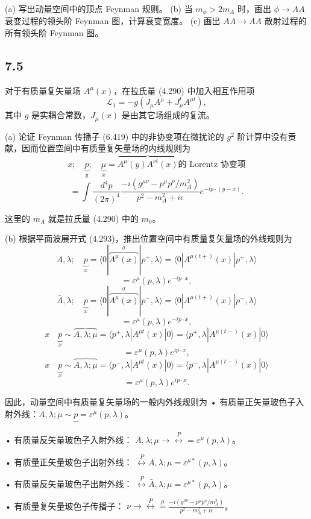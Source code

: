 (a) 写出动量空间中的顶点 Feynman 规则。
(b) 当 $m_\phi > 2m_A$ 时，画出 $\phi \rightarrow AA$ 衰变过程的领头阶 Feynman 图，计算衰变宽度。
(c) 画出 $AA \rightarrow AA$ 散射过程的所有领头阶 Feynman 图。

\newpage
\subsection{7.5}
对于有质量复矢量场 $A^\mu(x)$，在拉氏量 (4.290) 中加入相互作用项
$$ \mathcal{L}_1 = -g(J_\mu A^\mu + J_\mu^t A^{\mu t}), \tag{7.161} $$
其中 $g$ 是实耦合常数，$J_\mu(x)$ 是由其它场组成的复流。

(a) 论证 Feynman 传播子 (6.419) 中的非协变项在微扰论的 $g^2$ 阶计算中没有贡献，因而位置空间中有质量复矢量场的内线规则为
$$ x; \quad \underbrace{p}_{y}; \quad \underbrace{\mu}_{x} = \overbrace{A^\mu(y)A^{\nu t}(x)}_{} \text{的 Lorentz 协变项} $$
$$ = \int \frac{d^4p}{(2\pi)^4} \frac{-i(g^{\mu\nu} - p^\mu p^\nu / m_A^2)}{p^2 - m_A^2 + i\epsilon} e^{-ip\cdot(y-x)}. \tag{7.162} $$

这里的 $m_A$ 就是拉氏量 (4.290) 中的 $m_0$。

(b) 根据平面波展开式 (4.293)，推出位置空间中有质量复矢量场的外线规则为
$$ A, \lambda; \quad \underbrace{p}_{x} = \langle 0 | \overbrace{A^\mu(x)}^{\sigma} | p^+, \lambda \rangle = \langle 0 | A^{\mu(t+)} (x) | p^+, \lambda \rangle $$
$$ = \varepsilon^\mu(p, \lambda)e^{-ip\cdot x}, \tag{7.163} $$
$$ \bar{A}, \lambda; \quad \underbrace{p}_{x} = \langle 0 | \overbrace{A^\mu(x)}^{\sigma} | p^- , \lambda \rangle = \langle 0 | A^{\mu(t+)} (x) | p^- , \lambda \rangle $$
$$ = \varepsilon^\mu(p, \lambda)e^{-ip\cdot x}, \tag{7.164} $$
$$ x \quad \underbrace{p}_{x} \sim \overbrace{A, \lambda; \mu}_{} = \langle p^+, \lambda | A^{\mu t}(x) | 0 \rangle = \langle p^+, \lambda | A^{\mu(t-)} (x) | 0 \rangle $$
$$ = \varepsilon^\mu(p, \lambda)e^{ip\cdot x}, \tag{7.165} $$
$$ x \quad \underbrace{p}_{x} \sim \overbrace{A, \lambda; \mu}_{} = \langle p^-, \lambda | A^{\mu t}(x) | 0 \rangle = \langle p^-, \lambda | A^{\mu(t-)} (x) | 0 \rangle $$
$$ = \varepsilon^\mu(p, \lambda)e^{ip\cdot x}. \tag{7.166} $$

因此，动量空间中有质量复矢量场的一般内外线规则为
• 有质量正矢量玻色子入射外线：$A, \lambda; \mu \sim \underbrace{p}_{} = \varepsilon^\mu(p, \lambda)$。

• 有质量反矢量玻色子入射外线： $\bar{A}, \lambda; \mu \rightarrow \overset{P}{\longleftrightarrow} = \varepsilon^{\mu}(p, \lambda)$。

• 有质量正矢量玻色子出射外线： $\overset{P}{\longleftrightarrow} A, \lambda; \mu = \varepsilon^{\mu*}(p, \lambda)$。

• 有质量反矢量玻色子出射外线： $\overset{P}{\longleftrightarrow} \bar{A}, \lambda; \mu = \varepsilon^{\mu*}(p, \lambda)$。

• 有质量复矢量玻色子传播子： $\nu \rightarrow \overset{P}{\longleftrightarrow} \overset{\mu}{=} \frac{-i(g^{\mu\nu} - p^{\mu}p^{\nu}/m_A^2)}{p^2 - m_A^2 + i\epsilon}$。